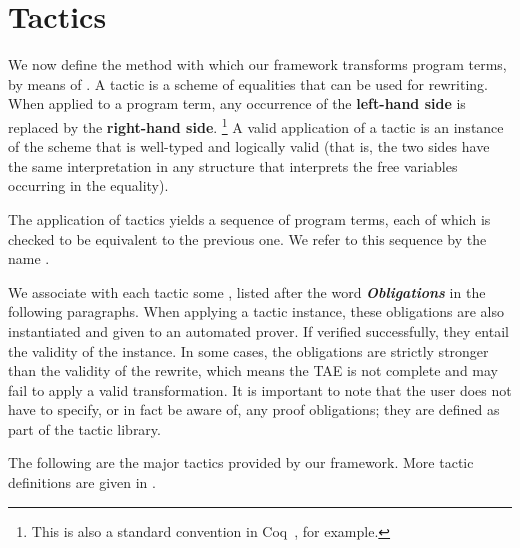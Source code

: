 \section{Tactics}
\label{tactics}

We now define the method with which our framework transforms program terms, by means of .
A tactic is a scheme of equalities that can be used for rewriting.
When applied to a program term, any occurrence of the {\bf left-hand side} is replaced by the {\bf right-hand side}.%
\footnote{This is also a standard convention in Coq~\cite{COQ}, for example.}
A valid application of a tactic is an instance of the scheme that is well-typed and logically valid
(that is, the two sides have the same interpretation in any structure that interprets the free
variables occurring in the equality).

The application of tactics yields a sequence of program terms, each of which is checked to
be equivalent to the previous one. We refer to this sequence by the name .

We associate with each tactic some , listed after the word \textbf{\textit{Obligations}}
in the following paragraphs.
When applying a tactic instance, these obligations are also instantiated and given to an automated prover. 
If verified successfully, they entail the validity of the instance.
\cbstart{}%
In some cases, the obligations are strictly stronger than the validity of the rewrite,
which means the TAE is not complete and may fail to apply a valid transformation.
It is important to note that the user does not have to specify, or in fact be aware of,
any proof obligations; they are defined as part of the tactic library.
\cbend

The following are the major tactics provided by our framework. 
More tactic definitions are given in .

\newcommand\Obligations{\medskip\noindent\textbf{\textit{Obligations}:} }
\newcommand\reduce{\operatorname{reduce}}
\newcommand\listConcat{{\scriptstyle \,++\,}}

\theoremstyle{definition}
\newtheorem{tactic}{Tactic}

\newcommand\tacticdef[1]{\subsection*{\sf\larger #1}}
\newcommand\tacticdefcompact[1]{\medskip\noindent{\sf\larger #1}\medskip\hfill}


